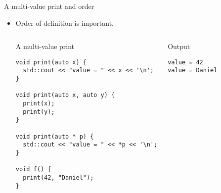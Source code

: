 \begin{frame}[t,fragile,shrink=15]{A multi-value print and order}
\begin{itemize}

  \item Order of definition is important.

\begin{columns}[T]

\begin{block}{A multi-value print}
\begin{lstlisting}
void print(auto x) {
  std::cout << "value = " << x << '\n';
}

void print(auto x, auto y) {
  print(x);
  print(y);
}

void print(auto * p) {
  std::cout << "value = " << *p << '\n';
}

void f() {
  print(42, "Daniel");
}
\end{lstlisting}
\end{block}

\begin{block}{Output}
\begin{lstlisting}[style=terminal]
value = 42
value = Daniel
\end{lstlisting}
\end{block}

\end{columns}
\end{itemize}
\end{frame}
